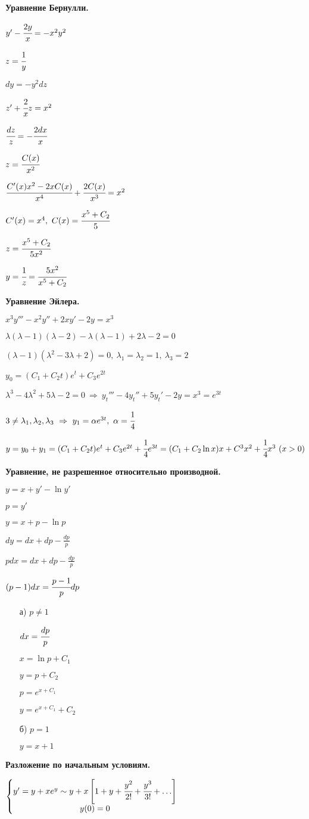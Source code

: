\documentclass[draft]{report}
\newcommand{\sys}[1]{\left\{\begin{matrix}#1\end{matrix}\right.}
\renewcommand{\l}{\lambda}
\begin{document}
{\bfseries Уравнение Бернулли.}

$y'-\cfrac{2y}x=-x^2y^2$

$z=\cfrac1y$

$dy=-y^2dz$

$z'+\cfrac2xz=x^2$

$\cfrac{dz}{z}=-\cfrac{2dx}{x}$

$z=\cfrac{C(x)}{x^2}$

$\cfrac{C'(x)x^2-2xC(x)}{x^4}+\cfrac{2C(x)}{x^3}=x^2$

$C'(x)=x^4,\ C(x)=\cfrac{x^5+C_2}{5}$

$z=\cfrac{x^5+C_2}{5x^2}$

$y=\cfrac1z=\cfrac{5x^2}{x^5+C_2}$

{\bfseries Уравнение Эйлера.}

$x^3y'''-x^2y''+2xy'-2y=x^3$

$\l(\l-1)(\l-2)-\l(\l-1)+2\l-2=0$

$(\l-1)(\l^2-3\l+2)=0,\ \l_1=\l_2=1,\ \l_3=2$

$y_0=(C_1+C_2t)e^t+C_3e^{2t}$

$\l^3-4\l^2+5\l-2=0\ \Rightarrow\ y_t'''-4y_t''+5y_t'-2y=x^3=e^{3t}$

$3\neq\l_1,\l_2,\l_3\ \Rightarrow\ y_1=\alpha e^{3t},\ \alpha=\cfrac14$

$y=y_0+y_1=(C_1+C_2t)e^t+C_3e^{2t}+\cfrac14e^{3t}=(C_1+C_2\ln x)x+C^3x^2+\cfrac14x^3\ (x>0)$

{\bfseries Уравнение, не разрешенное относительно производной.}

$y=x+y'-\ln y'$

$p=y'$

$y=x+p-\ln p$

$dy=dx+dp-\frac{dp}{p}$

$pdx=dx+dp-\frac{dp}{p}$

$(p-1)dx=\cfrac{p-1}pdp$
\begin{enumerate}
\item[а)] $p\neq1$

$dx=\cfrac{dp}p$

$x=\ln p+C_1$

$y=p+C_2$

$p=e^{x+C_1}$

$y=e^{x+C_1}+C_2$
\item[б)] $p=1$

$y=x+1$
\end{enumerate}
{\bfseries Разложение по начальным условиям.}

$\sys{y'=y+xe^y\sim y+x\left[1+y+\cfrac{y^2}{2!}+\cfrac{y^3}{3!}+\ldots\right] \\ y(0)=0}$
\end{document}
